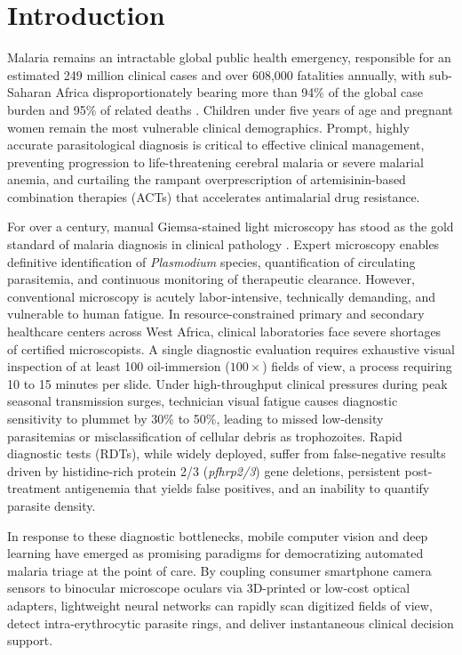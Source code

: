 \documentclass[a4paper,11pt]{article}
\begin{document}
\vspace{1.5em}

\section{Introduction}
\label{sec:intro}

Malaria remains an intractable global public health emergency, responsible for an estimated 249 million clinical cases and over 608,000 fatalities annually, with sub-Saharan Africa disproportionately bearing more than 94\% of the global case burden and 95\% of related deaths \citep{who2023}. Children under five years of age and pregnant women remain the most vulnerable clinical demographics. Prompt, highly accurate parasitological diagnosis is critical to effective clinical management, preventing progression to life-threatening cerebral malaria or severe malarial anemia, and curtailing the rampant overprescription of artemisinin-based combination therapies (ACTs) that accelerates antimalarial drug resistance.

For over a century, manual Giemsa-stained light microscopy has stood as the gold standard of malaria diagnosis in clinical pathology \citep{who2016}. Expert microscopy enables definitive identification of \textit{Plasmodium} species, quantification of circulating parasitemia, and continuous monitoring of therapeutic clearance. However, conventional microscopy is acutely labor-intensive, technically demanding, and vulnerable to human fatigue. In resource-constrained primary and secondary healthcare centers across West Africa, clinical laboratories face severe shortages of certified microscopists. A single diagnostic evaluation requires exhaustive visual inspection of at least 100 oil-immersion ($100\times$) fields of view, a process requiring 10 to 15 minutes per slide. Under high-throughput clinical pressures during peak seasonal transmission surges, technician visual fatigue causes diagnostic sensitivity to plummet by 30\% to 50\%, leading to missed low-density parasitemias or misclassification of cellular debris as trophozoites. Rapid diagnostic tests (RDTs), while widely deployed, suffer from false-negative results driven by histidine-rich protein 2/3 (\textit{pfhrp2/3}) gene deletions, persistent post-treatment antigenemia that yields false positives, and an inability to quantify parasite density.

In response to these diagnostic bottlenecks, mobile computer vision and deep learning have emerged as promising paradigms for democratizing automated malaria triage at the point of care. By coupling consumer smartphone camera sensors to binocular microscope oculars via 3D-printed or low-cost optical adapters, lightweight neural networks can rapidly scan digitized fields of view, detect intra-erythrocytic parasite rings, and deliver instantaneous clinical decision support.
\end{document}

